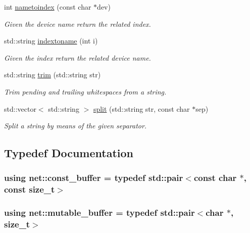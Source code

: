\begin{DoxyCompactItemize}
int \hyperlink{namespacenet_aa90cbca6e910724bc46d5f4c2b12cddf}{nametoindex} (const char $\ast$dev)
\begin{DoxyCompactList}\small\item\em Given the device name return the related index. \end{DoxyCompactList}\item 
std\+::string \hyperlink{namespacenet_ac7628d7e4c8e89d8ada4d75c292f575f}{indextoname} (int i)
\begin{DoxyCompactList}\small\item\em Given the index return the related device name. \end{DoxyCompactList}\item 
std\+::string \hyperlink{namespacenet_a89ef9cb5b1526b5c5f613a837adc6392}{trim} (std\+::string str)
\begin{DoxyCompactList}\small\item\em Trim pending and trailing whitespaces from a string. \end{DoxyCompactList}\item 
std\+::vector$<$ std\+::string $>$ \hyperlink{namespacenet_af79f3419ccd7c7717d61ecb186f9faba}{split} (std\+::string str, const char $\ast$sep)
\begin{DoxyCompactList}\small\item\em Split a string by means of the given separator. \end{DoxyCompactList}\end{DoxyCompactItemize}


\subsection{Typedef Documentation}
\hypertarget{namespacenet_a05639001760fe5164b163078b5ccc2c0}{
\subsubsection[{const\+\_\+buffer}]{\setlength{\rightskip}{0pt plus 5cm}using {\bf net\+::const\+\_\+buffer} = typedef std\+::pair$<$const char $\ast$, const size\+\_\+t$>$}}\label{namespacenet_a05639001760fe5164b163078b5ccc2c0}
\hypertarget{namespacenet_ac0df3fa0efbc044d8a2441906e8f61cb}{
\subsubsection[{mutable\+\_\+buffer}]{\setlength{\rightskip}{0pt plus 5cm}using {\bf net\+::mutable\+\_\+buffer} = typedef std\+::pair$<$char $\ast$, size\+\_\+t$>$}}\label{namespacenet_ac0df3fa0efbc044d8a2441906e8f61cb}


